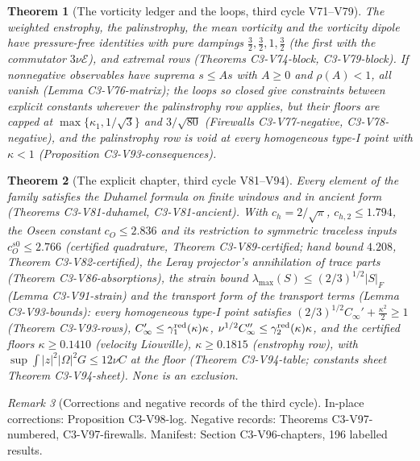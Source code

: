 \documentclass[11pt]{article}
\theoremstyle{plain}
\newtheorem{theorem}{Theorem}[section]
\theoremstyle{definition}
\theoremstyle{remark}
\newtheorem{remark}[theorem]{Remark}
\begin{document}
\begin{theorem}[The vorticity ledger and the loops, third cycle V71--V79]
\label{thm:c4v1-vorticity}
The weighted enstrophy, the palinstrophy, the mean vorticity and
the vorticity dipole have pressure-free identities with pure
dampings \(\frac32,\frac32,1,\frac32\) (the first with the commutator \(3\nu\mathcal E\)), and
extremal rows (Theorems C3-V74-block, C3-V79-block).  If
nonnegative observables have suprema \(s\le As\) with \(A\ge0\) and \(\rho(A)<1\),
all vanish (Lemma C3-V76-matrix); the loops so closed give
constraints between explicit constants wherever the palinstrophy
row applies, but their floors are capped at \(\max\{\kappa_1,1/\sqrt3\}\) and
\(3/\sqrt{80}\) (Firewalls C3-V77-negative, C3-V78-negative), and
the palinstrophy row is void at every homogeneous type-I point
with \(\kappa<1\) (Proposition C3-V93-consequences).
\end{theorem}

\begin{theorem}[The explicit chapter, third cycle V81--V94]
\label{thm:c4v1-explicit}
Every element of the family satisfies the Duhamel formula on finite
windows and in ancient form (Theorems C3-V81-duhamel,
C3-V81-ancient).  With \(c_h=2/\sqrt\pi\), \(c_{h,2}\le1.794\), the Oseen constant
\(c_O\le2.836\) and its restriction to symmetric traceless inputs
\(c_O^{s0}\le2.766\) (certified quadrature, Theorem C3-V89-certified;
hand bound \(4.208\), Theorem C3-V82-certified), the Leray
projector's annihilation of trace parts (Theorem C3-V86-absorptions),
the strain bound \(\lambda_{\max}(S)\le(2/3)^{1/2}|S|_F\) (Lemma C3-V91-strain) and
the transport form of the transport terms (Lemma C3-V93-bounds):
every homogeneous type-I point satisfies \((2/3)^{1/2}C_\infty'+\frac{\kappa^2}2\ge1\)
(Theorem C3-V93-rows), \(C_\infty'\le\gamma_1^{\rm red}(\kappa)\kappa\),
\(\nu^{1/2}C_\infty''\le\gamma_2^{\rm red}(\kappa)\kappa\), and the certified floors
\(\kappa\ge0.1410\) (velocity Liouville), \(\kappa\ge0.1815\) (enstrophy row), with
\(\sup\int|z|^2|\Omega|^2G\le12\nu C\) at the floor (Theorem C3-V94-table;
constants sheet Theorem C3-V94-sheet).  None is an exclusion.
\end{theorem}

\begin{remark}[Corrections and negative records of the third cycle]
\label{rem:c4v1-corrections3}
In-place corrections: Proposition C3-V98-log.  Negative
records: Theorems C3-V97-numbered, C3-V97-firewalls.
Manifest: Section C3-V96-chapters, 196 labelled results.
\end{remark}
\end{document}
